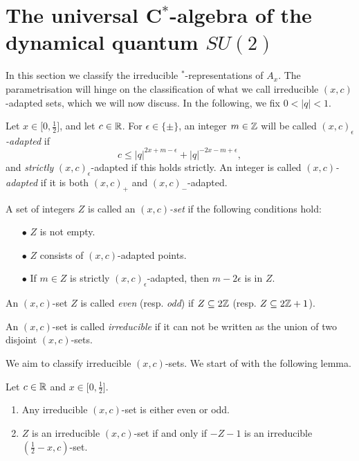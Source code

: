 \section{The universal C$^*$-algebra of the dynamical quantum $SU(2)$}


In this section we classify the irreducible $^*$-representations of $A_x$. The parametrisation will hinge on the classification of what we call irreducible $(x,c)$-adapted sets, which we will now discuss. In the following, we fix $0<|q|<1$.

\begin{Def}\label{DefAdapt} Let $x\in \lbrack 0,\frac{1}{2}\rbrack$, and let $c\in\mathbb{R}$. For $\epsilon \in \{\pm\}$, an integer $m\in \mathbb{Z}$ will be called \emph{$(x,c)_{\epsilon}$-adapted} if \begin{equation}\label{EqAd+}c \leq |q|^{2x+m-\epsilon}+|q|^{-2x-m+\epsilon},\end{equation} and \emph{strictly} $(x,c)_{\epsilon}$-adapted if this holds strictly. An integer is called \emph{$(x,c)$-adapted} if it is both $(x,c)_+$ and $(x,c)_-$-adapted. 

A set of integers $Z$ is called an  \emph{$(x,c)$-set} if the following conditions hold: \begin{itemize} 
\item[$\bullet$] $Z$ is not empty.
\item[$\bullet$] $Z$ consists of $(x,c)$-adapted points.
\item[$\bullet$] If $m\in Z$ is strictly $(x,c)_{\epsilon}$-adapted, then $m-2\epsilon$ is in $Z$.
\end{itemize}
An $(x,c)$-set $Z$ is called \emph{even} (resp. \emph{odd}) if $Z\subseteq 2\mathbb{Z}$ (resp. $Z\subseteq 2\mathbb{Z}+1$).

An $(x,c)$-set is called \emph{irreducible} if it can not be written as the union of two disjoint $(x,c)$-sets.
\end{Def}


We aim to classify irreducible $(x,c)$-sets. We start of with the following lemma.

\begin{Lem} Let $c\in\mathbb{R}$ and $x\in \lbrack 0,\frac{1}{2}\rbrack$.
\begin{enumerate} \item Any irreducible $(x,c)$-set is either even or odd.
\item $Z$ is an irreducible $(x,c)$-set if and only if $-Z-1$ is an irreducible $(\frac{1}{2}-x,c)$-set.
\end{enumerate}
\end{Lem}

